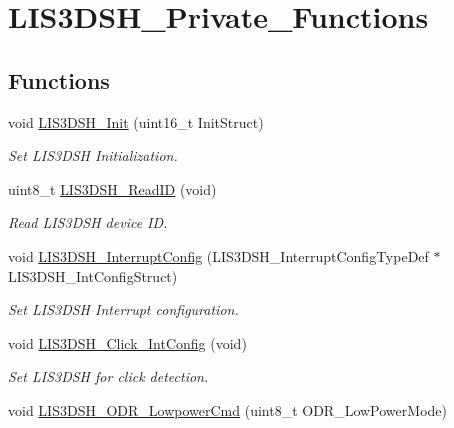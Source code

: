\hypertarget{group__LIS3DSH__Private__Functions}{\section{L\-I\-S3\-D\-S\-H\-\_\-\-Private\-\_\-\-Functions}
\label{group__LIS3DSH__Private__Functions}
}
\subsection*{Functions}
\begin{DoxyCompactItemize}
\item 
void \hyperlink{group__LIS3DSH__Private__Functions_ga39a50faf3ec718fd4782fd951e6db26b}{L\-I\-S3\-D\-S\-H\-\_\-\-Init} (uint16\-\_\-t Init\-Struct)
\begin{DoxyCompactList}\small\item\em Set L\-I\-S3\-D\-S\-H Initialization. \end{DoxyCompactList}\item 
uint8\-\_\-t \hyperlink{group__LIS3DSH__Private__Functions_ga47e1a458eddb3143569fe0e995f0513f}{L\-I\-S3\-D\-S\-H\-\_\-\-Read\-I\-D} (void)
\begin{DoxyCompactList}\small\item\em Read L\-I\-S3\-D\-S\-H device I\-D. \end{DoxyCompactList}\item 
void \hyperlink{group__LIS3DSH__Private__Functions_gaf1053e873f761ba33cdefd61ddba03eb}{L\-I\-S3\-D\-S\-H\-\_\-\-Interrupt\-Config} (L\-I\-S3\-D\-S\-H\-\_\-\-Interrupt\-Config\-Type\-Def $\ast$L\-I\-S3\-D\-S\-H\-\_\-\-Int\-Config\-Struct)
\begin{DoxyCompactList}\small\item\em Set L\-I\-S3\-D\-S\-H Interrupt configuration. \end{DoxyCompactList}\item 
void \hyperlink{group__LIS3DSH__Private__Functions_ga0bf34901c622846b07db03299bb9a3a1}{L\-I\-S3\-D\-S\-H\-\_\-\-Click\-\_\-\-Int\-Config} (void)
\begin{DoxyCompactList}\small\item\em Set L\-I\-S3\-D\-S\-H for click detection. \end{DoxyCompactList}\item 
void \hyperlink{group__LIS3DSH__Private__Functions_gaee0eec1d1444f4da48efeec019481270}{L\-I\-S3\-D\-S\-H\-\_\-\-O\-D\-R\-\_\-\-Lowpower\-Cmd} (uint8\-\_\-t O\-D\-R\-\_\-\-Low\-Power\-Mode)

\end{DoxyCompactItemize}
